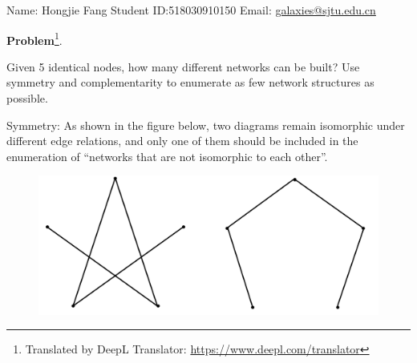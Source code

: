 \documentclass{oxmathproblems}
\theoremstyle{definition}
\begin{document}
\begin{center}
	Name: Hongjie Fang \quad Student ID:518030910150 \quad Email: \href{mailto:galaxies@sjtu.edu.cn}{galaxies@sjtu.edu.cn}
\end{center}
\textbf{Problem}\footnote{Translated by DeepL Translator: \url{https://www.deepl.com/translator}}.

Given 5 identical nodes, how many different networks can be built? Use symmetry and complementarity to enumerate as few network structures as possible.

Symmetry: As shown in the figure below, two diagrams remain isomorphic under different edge relations, and only one of them should be included in the enumeration of ``networks that are not isomorphic to each other''.
\begin{figure}[htbp]
	\centering
	\includegraphics[width=0.5\linewidth]{1.png}
	\label{fig1}
\end{figure}
\end{document}
